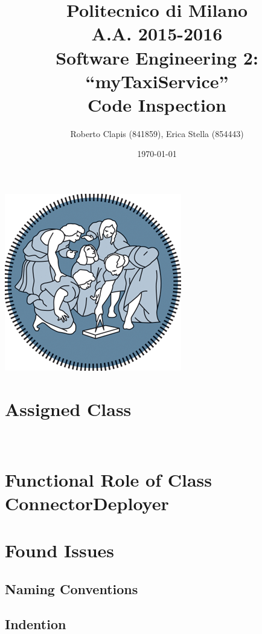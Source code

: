 \documentclass{article}
\author{Roberto Clapis (841859), Erica Stella (854443)}
\date{\today}
\title{Politecnico di Milano
	\\A.A. 2015\@-\@2016
	\\Software Engineering 2: ``myTaxiService''
	\\\textbf{C}ode \textbf{I}nspection}
\begin{document}
	\maketitle
	\begin{center}
		\includegraphics{polimi-logo}
	\end{center}
	\clearpage
	\tableofcontents
	\clearpage
	
\section{Assigned Class}
  	
\section{Functional Role of Class ConnectorDeployer}

\section{Found Issues}

\subsection{Naming Conventions}
\subsection{Indention}
\end{document}

